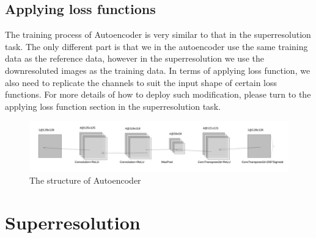 \documentclass[a4paper,12pt,twoside]{report}
\begin{document}
\subsection{Applying loss functions}
The training process of Autoencoder is very similar to that in the superresolution task. The only different part is that we in the autoencoder use the same training data as the reference data, however in the superresolution we use the downresoluted images as the training data. In terms of applying loss function, we also need to replicate the channels to suit the input shape of certain loss functions. For more details of how to deploy such modification, please turn to the applying loss function section in the superresolution task.


\begin{figure}
  \centering
  \includegraphics[width=\textwidth]{autoencoder.png}
  \caption{The structure of Autoencoder}
\end{figure}

\section{Superresolution}
\end{document}

